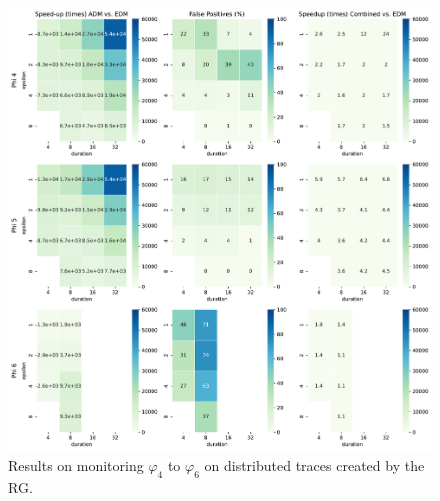 \begin{figure}[h]
	\begin{center}
		\includegraphics[width=\linewidth]{speedup_appendix}
		\caption{Results on monitoring $\varphi_{4}$ to $\varphi_{6}$ on distributed traces created by the RG.}
		\label{fig:rgresults2}
	\end{center}
	\vspace{1em}
\end{figure}
